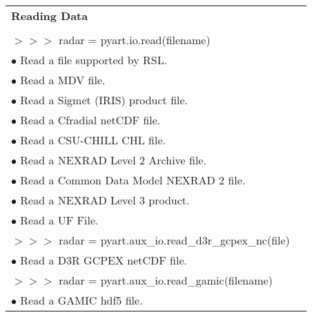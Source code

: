 \documentclass[potrait, z1paper, fontscale=0.33]{baposter} %
\begin{document}
\begin{poster}
{\begin{flushleft}
\begin{tabular}{@{}ll@{}}
\multicolumn{2}{l}{\cellcolor[HTML]{DDFFFF}\bf Reading Data} \\
\\
$>$$>$$>$ radar = pyart.io.read(filename)\\
\-\hspace{0.4cm} $\bullet$ Read a file supported by RSL.\\
\-\hspace{0.4cm} $\bullet$ Read a MDV file.\\
\-\hspace{0.4cm} $\bullet$ Read a Sigmet (IRIS) product file.\\
\-\hspace{0.4cm} $\bullet$ Read a Cfradial netCDF file.\\
\-\hspace{0.4cm} $\bullet$ Read a CSU-CHILL CHL file.\\
\-\hspace{0.4cm} $\bullet$ Read a NEXRAD Level 2 Archive file.\\
\-\hspace{0.4cm} $\bullet$ Read a Common Data Model NEXRAD 2 file.\\
\-\hspace{0.4cm} $\bullet$ Read a NEXRAD Level 3 product.\\
\-\hspace{0.4cm} $\bullet$ Read a UF File.\\
$>$$>$$>$ radar = pyart.aux\_io.read\_d3r\_gcpex\_nc(file)\\
\-\hspace{0.4cm} $\bullet$ Read a D3R GCPEX netCDF file.\\
$>$$>$$>$ radar = pyart.aux\_io.read\_gamic(filename)\\
\-\hspace{0.4cm} $\bullet$ Read a GAMIC hdf5 file.\\
\end{tabular}
\end{flushleft}
}


\end{poster}
\end{document}
